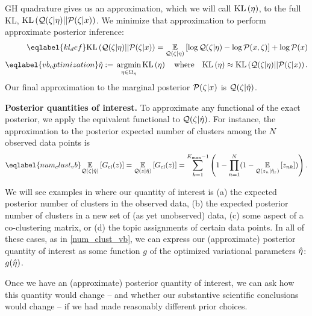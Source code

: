 GH quadrature gives us an approximation, which we will call $\mathrm{KL}\left(\eta\right)$, to the full KL, $\mathrm{KL}\left(\mathcal{Q}(\zeta \vert \eta) || \mathcal{P}(\zeta \vert x)\right)$.
We minimize that approximation
to perform approximate posterior inference:
%
\begin{align}
%
\eqlabel{kl_def}
\KL{\q(\zeta \vert \eta) || \p(\zeta \vert \x)}
={}    \expect{\q(\zeta \vert \eta)}{
        \log \q(\zeta \vert \eta) - \log\p(\x, \zeta)} + \log\p(\x) \\
%
\eqlabel{vb_optimization}
\etaopt :={} \argmin_{\eta \in \etadom} \KL{\eta} \mathwhere
\KL{\eta} \approx{} \KL{\q(\zeta \vert \eta) || \p(\zeta \vert \x)}.
%
\end{align}
%
Our final approximation to the marginal posterior $\mathcal{P}(\zeta \vert x)$
is $\mathcal{Q}(\zeta \vert \hat\eta)$.

\noindent \textbf{Posterior quantities of interest.}
To approximate any functional of the exact posterior, we apply the equivalent functional to
$\mathcal{Q}(\zeta \vert \hat\eta)$. For instance, the approximation to the posterior expected number of clusters
among the
$N$ observed data points is
%
\begin{align} \eqlabel{num_clust_vb}
%
\expect{\q(\zeta \vert\etaopt)}{\nclusters(\z)} =
\expect{\q(\z\vert\etaopt)}{\nclusters(\z)} =
\sumkm \left(1 -  \prod_{\n=1}^\N
    (1 - \expect{\q(\z_\n \vert \etaoptz)}{\z_{\n\k}})\right).
%
\end{align}
%

We will see examples in  where our quantity of interest is
(a) the expected posterior number of clusters in the observed data, (b) the expected posterior
number of clusters in a new set of (as yet unobserved) data, (c) some
aspect of a co-clustering matrix, or (d) the topic assignments of certain data points.
In all of these cases, as in \eqref{num_clust_vb}, we can express our (approximate) posterior quantity of interest as some function $g$ of the optimized variational parameters $\hat\eta$: $g(\hat\eta)$.

Once we have an (approximate) posterior quantity of interest, we can ask how this quantity would change -- and
whether our substantive scientific conclusions would change -- if we had made reasonably different prior choices.